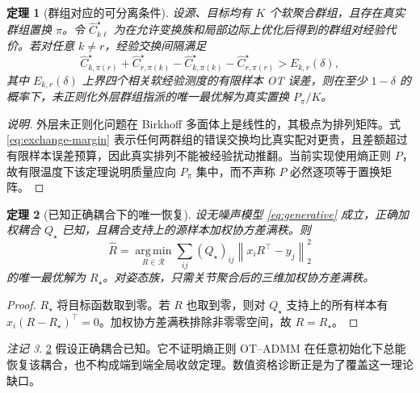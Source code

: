 \documentclass[10pt,a4paper,fontset=windows]{ctexart}
\newcommand{\norm}[1]{\left\lVert #1\right\rVert}
\newcommand{\argmin}{\operatorname*{arg\,min}}
\newtheorem{theorem}{定理}
\theoremstyle{definition}
\theoremstyle{remark}
\newtheorem{remark}[theorem]{注记}
\begin{document}
\begin{theorem}[群组对应的可分离条件]
\label{thm:correspondence}
设源、目标均有 $K$ 个软聚合群组，且存在真实群组置换 $\pi$。令 $\widehat C_{k\ell}^{\star}$ 为在允许变换族和局部边际上优化后得到的群组对经验代价。若对任意 $k\ne r$，经验交换间隔满足
\begin{equation}
\widehat C_{k,\pi(r)}^{\star}+\widehat C_{r,\pi(k)}^{\star}
-\widehat C_{k,\pi(k)}^{\star}-\widehat C_{r,\pi(r)}^{\star}
>E_{k,r}(\delta),
\label{eq:exchange-margin}
\end{equation}
其中 $E_{k,r}(\delta)$ 上界四个相关软经验测度的有限样本 OT 误差，则在至少 $1-\delta$ 的概率下，未正则化外层群组指派的唯一最优解为真实置换 $P_\pi/K$。
\end{theorem}
\begin{proof}[说明]
外层未正则化问题在 Birkhoff 多面体上是线性的，其极点为排列矩阵。式 \cref{eq:exchange-margin} 表示任何两群组的错误交换均比真实配对更贵，且差额超过有限样本误差预算，因此真实排列不能被经验扰动推翻。当前实现使用熵正则 $P$，故有限温度下该定理说明质量应向 $P_\pi$ 集中，而不声称 $P$ 必然逐项等于置换矩阵。
\end{proof}

\begin{theorem}[已知正确耦合下的唯一恢复]
\label{thm:recovery}
设无噪声模型 \cref{eq:generative} 成立，正确加权耦合 $Q_\star$ 已知，且耦合支持上的源样本加权协方差满秩。则
\begin{equation}
\widehat R=\argmin_{R\in\mathcal R}
\sum_{ij}(Q_\star)_{ij}\norm{x_iR^\top-y_j}_2^2
\end{equation}
的唯一最优解为 $R_\star$。对姿态族，只需关节聚合后的三维加权协方差满秩。
\end{theorem}
\begin{proof}
$R_\star$ 将目标函数取到零。若 $R$ 也取到零，则对 $Q_\star$ 支持上的所有样本有 $x_i(R-R_\star)^\top=0$。加权协方差满秩排除非零零空间，故 $R=R_\star$。
\end{proof}

\begin{remark}
\cref{thm:recovery} 假设正确耦合已知。它不证明熵正则 OT--ADMM 在任意初始化下总能恢复该耦合，也不构成端到端全局收敛定理。数值资格诊断正是为了覆盖这一理论缺口。
\end{remark}
\end{document}
